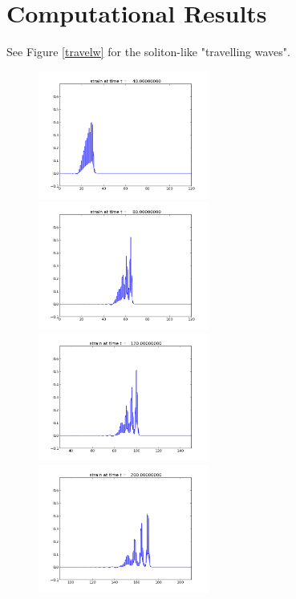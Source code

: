 \documentclass{article}
\begin{document}
\section{Computational Results}
See Figure \ref{travelw} for the soliton-like "travelling waves".
\begin{figure}
  \includegraphics[width=0.5\textwidth]{frame0004fig1.png}
  \includegraphics[width=0.5\textwidth]{frame0008fig1.png}
  \includegraphics[width=0.5\textwidth]{frame0012fig1.png}
  \includegraphics[width=0.5\textwidth]{frame0020fig1.png}

\end{figure}
\end{document}
